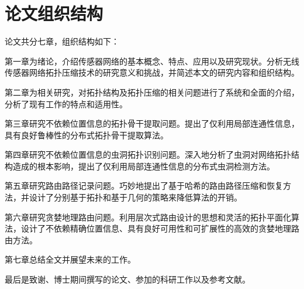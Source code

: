 \section{论文组织结构}
论文共分七章，组织结构如下：

第一章为绪论，介绍传感器网络的基本概念、特点、应用以及研究现状。分析无线传感器网络拓扑压缩技术的研究意义和挑战，并简述本文的研究内容和组织结构。

第二章为相关研究，对拓扑结构及拓扑压缩的相关问题进行了系统和全面的介绍，分析了现有工作的特点和适用性。

第三章研究不依赖位置信息的拓扑骨干提取问题。提出了仅利用局部连通性信息，具有良好鲁棒性的分布式拓扑骨干提取算法。

第四章研究不依赖位置信息的虫洞拓扑识别问题。深入地分析了虫洞对网络拓扑结构造成的根本影响，提出了仅利用局部连通性信息的分布式虫洞检测方法。

第五章研究路由路径记录问题。巧妙地提出了基于哈希的路由路径压缩和恢复方法，并设计了分别基于拓扑和基于几何的策略来降低算法的开销。

第六章研究贪婪地理路由问题。利用层次式路由设计的思想和灵活的拓扑平面化算法，设计了不依赖精确位置信息、具有良好可用性和可扩展性的高效的贪婪地理路由方法。

第七章总结全文并展望未来的工作。

最后是致谢、博士期间撰写的论文、参加的科研工作以及参考文献。
